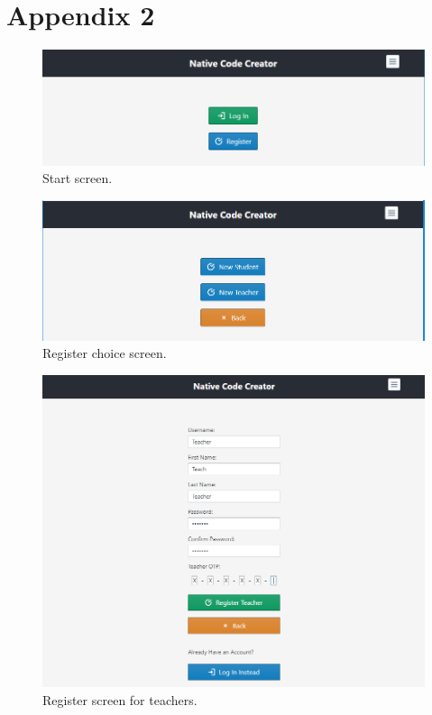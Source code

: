 \documentclass[draftclsnofoot,10pt,onecolumn]{IEEEtran}
\begin{document}
\clearpage
\section{Appendix 2}%
\begin{figure}[h]
    \centering
    \includegraphics[width=\textwidth]{caps1}
    \caption{Start screen.}
\end{figure}

\begin{figure}[h]
    \centering
    \includegraphics[width=\textwidth]{caps2}
    \caption{Register choice screen.}
\end{figure}

\begin{figure}[h]
    \centering
    \includegraphics[width=\textwidth]{caps3}
    \caption{Register screen for teachers.}
\end{figure}
\end{document}
